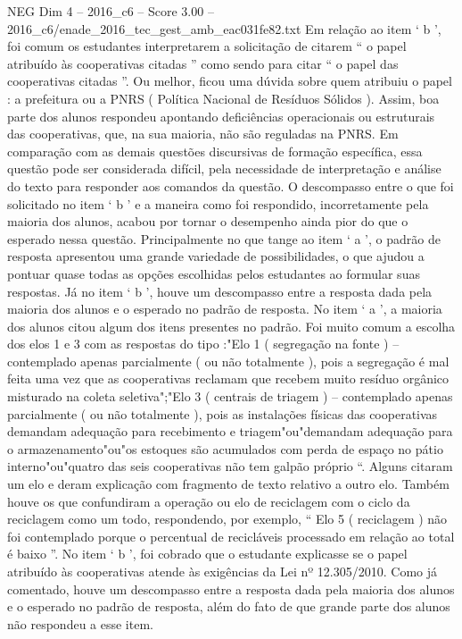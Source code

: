 \begin{textsample}{NEG Dim 4 – 2016\_c6 – Score 3.00 – 2016\_c6/enade\_2016\_tec\_gest\_amb\_eac031fe82.txt}
Em relação ao item ‘ b ’, foi comum os estudantes interpretarem a solicitação de citarem “ o papel atribuído às cooperativas citadas ” como sendo para citar “ o papel das cooperativas citadas ”.
Ou melhor, ficou uma dúvida sobre quem atribuiu o papel : a prefeitura ou a PNRS ( Política Nacional de Resíduos Sólidos ).
Assim, boa parte dos alunos respondeu apontando deficiências operacionais ou estruturais das cooperativas, que, na sua maioria, não são reguladas na PNRS.
Em comparação com as demais questões discursivas de formação específica, essa questão pode ser considerada difícil, pela necessidade de interpretação e análise do texto para responder aos comandos da questão.
O descompasso entre o que foi solicitado no item ‘ b ’ e a maneira como foi respondido, incorretamente pela maioria dos alunos, acabou por tornar o desempenho ainda pior do que o esperado nessa questão.
Principalmente no que tange ao item ‘ a ’, o padrão de resposta apresentou uma grande variedade de possibilidades, o que ajudou a pontuar quase todas as opções escolhidas pelos estudantes ao formular suas respostas.
Já no item ‘ b ’, houve um descompasso entre a resposta dada pela maioria dos alunos e o esperado no padrão de resposta.
No item ‘ a ’, a maioria dos alunos citou algum dos itens presentes no padrão.
Foi muito comum a escolha dos elos 1 e 3 com as respostas do tipo :"Elo 1 ( segregação na fonte ) – contemplado apenas parcialmente ( ou não totalmente ), pois a segregação é mal feita uma vez que as cooperativas reclamam que recebem muito resíduo orgânico misturado na coleta seletiva";"Elo 3 ( centrais de triagem ) – contemplado apenas parcialmente ( ou não totalmente ), pois as instalações físicas das cooperativas demandam adequação para recebimento e triagem"ou"demandam adequação para o armazenamento"ou"os estoques são acumulados com perda de espaço no pátio interno"ou"quatro das seis cooperativas não tem galpão próprio “.
Alguns citaram um elo e deram explicação com fragmento de texto relativo a outro elo.
Também houve os que confundiram a operação ou elo de reciclagem com o ciclo da reciclagem como um todo, respondendo, por exemplo, “ Elo 5 ( reciclagem ) não foi contemplado porque o percentual de recicláveis processado em relação ao total é baixo ”.
No item ‘ b ’, foi cobrado que o estudante explicasse se o papel atribuído às cooperativas atende às exigências da Lei nº 12.305/2010.
Como já comentado, houve um descompasso entre a resposta dada pela maioria dos alunos e o esperado no padrão de resposta, além do fato de que grande parte dos alunos não respondeu a esse item.

\end{textsample}
